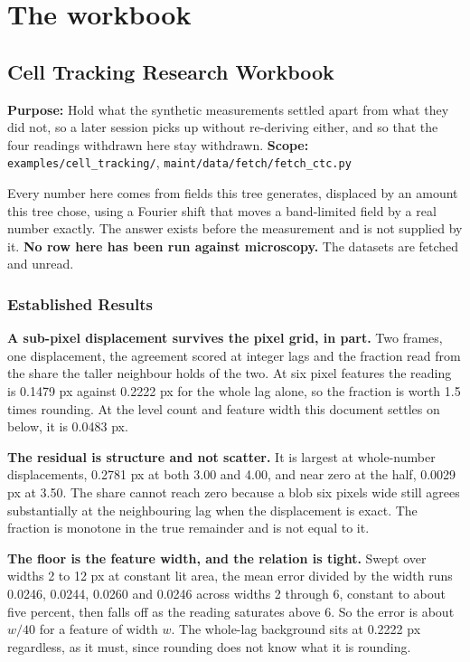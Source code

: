 \chapter{The workbook}

\section{Cell Tracking Research Workbook}

\textbf{Purpose:} Hold what the synthetic measurements settled apart from what they did not, so a
later session picks up without re-deriving either, and so that the four readings withdrawn here stay
withdrawn. \textbf{Scope:} \texttt{examples/\allowbreak{}cell\_\allowbreak{}tracking/\allowbreak{}},
\texttt{maint/\allowbreak{}data/\allowbreak{}fetch/\allowbreak{}fetch\_\allowbreak{}ctc.\allowbreak{}py}

Every number here comes from fields this tree generates, displaced by an amount this tree chose,
using a Fourier shift that moves a band-limited field by a real number exactly. The answer exists
before the measurement and is not supplied by it. \textbf{No row here has been run against
microscopy.} The datasets are fetched and unread.

\subsection{Established Results}

\textbf{A sub-pixel displacement survives the pixel grid, in part.} Two frames, one displacement,
the agreement scored at integer lags and the fraction read from the share the taller neighbour holds
of the two. At six pixel features the reading is 0.1479 px against 0.2222 px for the whole lag
alone, so the fraction is worth 1.5 times rounding. At the level count and feature width this
document settles on below, it is 0.0483 px.

\textbf{The residual is structure and not scatter.} It is largest at whole-number displacements,
0.2781 px at both 3.00 and 4.00, and near zero at the half, 0.0029 px at 3.50. The share cannot
reach zero because a blob six pixels wide still agrees substantially at the neighbouring lag when
the displacement is exact. The fraction is monotone in the true remainder and is not equal to it.

\textbf{The floor is the feature width, and the relation is tight.} Swept over widths 2 to 12 px at
constant lit area, the mean error divided by the width runs 0.0246, 0.0244, 0.0260 and 0.0246 across
widths 2 through 6, constant to about five percent, then falls off as the reading saturates above 6.
So the error is about $w/40$ for a feature of width $w$. The whole-lag background sits at 0.2222 px
regardless, as it must, since rounding does not know what it is rounding.

